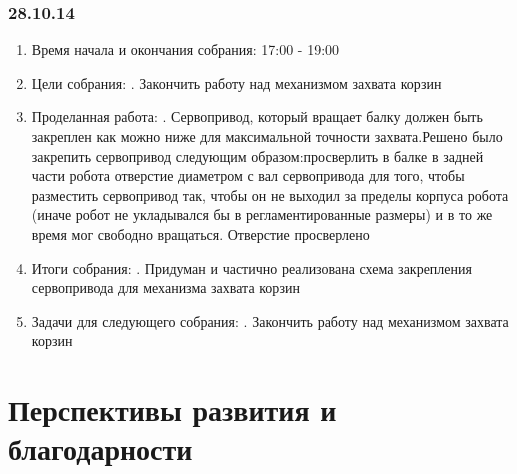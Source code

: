 \documentclass[11pt]{article}
\begin{document}
             \subsubsection{28.10.14}
             \begin{enumerate}
                \item Время начала и окончания собрания:
                17:00 - 19:00
                \newline
                \item Цели собрания:
                . Закончить работу над механизмом захвата корзин
                \item Проделанная работа:
                . Сервопривод, который вращает балку должен быть закреплен как можно ниже для максимальной точности захвата.Решено было закрепить сервопривод следующим образом:просверлить в балке в задней части робота отверстие диаметром с вал сервопривода для того, чтобы разместить сервопривод так, чтобы он не выходил за пределы корпуса робота (иначе робот не укладывался бы в регламентированные размеры) и в то же время мог свободно вращаться. Отверстие просверлено
                \item Итоги собрания:
                . Придуман и частично реализована схема закрепления сервопривода для механизма захвата корзин
                \item Задачи для следующего собрания:
                . Закончить работу над механизмом захвата корзин
             \end{enumerate}
             \newpage
      \section{Перспективы развития и благодарности}

      
      
\end{document}
